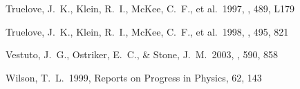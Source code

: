 \begin{thebibliography}{60}
 Truelove, J.~K.,  Klein, R.~I., McKee, C.~F., et al.\ 1997, \apjl, 489, L179    

 Truelove, J.~K.,  Klein, R.~I., McKee, C.~F., et al.\ 1998, \apj, 495, 821    

 Vestuto, J.~G.,  Ostriker, E.~C., \& Stone, J.~M.\ 2003, \apj, 590, 858    

 Wilson, T.~L.\ 1999, Reports on  Progress in Physics, 62, 143    

\end{thebibliography}
